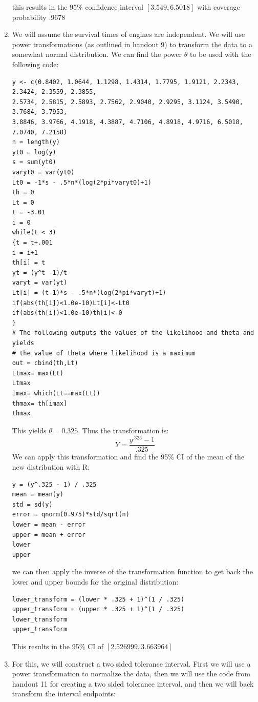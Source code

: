 \documentclass{article}
\begin{document}
\begin{enumerate}
this results in the 95\% confidence interval $[3.549, 6.5018]$ with coverage probability .9678
\item We will assume the survival times of engines are independent. We will use power transformations (as outlined in handout 9) to transform the data to a somewhat normal distribution. We can find the power $\theta$ to be used with the following code: \\
\begin{verbatim}
y <- c(0.8402, 1.0644, 1.1298, 1.4314, 1.7795, 1.9121, 2.2343, 2.3424, 2.3559, 2.3855,
2.5734, 2.5815, 2.5893, 2.7562, 2.9040, 2.9295, 3.1124, 3.5490, 3.7684, 3.7953,
3.8846, 3.9766, 4.1918, 4.3887, 4.7106, 4.8918, 4.9716, 6.5018, 7.0740, 7.2158)
n = length(y)
yt0 = log(y)
s = sum(yt0)
varyt0 = var(yt0)
Lt0 = -1*s - .5*n*(log(2*pi*varyt0)+1)
th = 0
Lt = 0
t = -3.01
i = 0
while(t < 3)
{t = t+.001
i = i+1
th[i] = t
yt = (y^t -1)/t
varyt = var(yt)
Lt[i] = (t-1)*s - .5*n*(log(2*pi*varyt)+1)
if(abs(th[i])<1.0e-10)Lt[i]<-Lt0
if(abs(th[i])<1.0e-10)th[i]<-0
}
# The following outputs the values of the likelihood and theta and yields
# the value of theta where likelihood is a maximum
out = cbind(th,Lt)
Ltmax= max(Lt)
Ltmax
imax= which(Lt==max(Lt))
thmax= th[imax]
thmax
\end{verbatim}
This yields $\theta = 0.325$. Thus the transformation is: \\
\[
Y = \frac{y^{.325} - 1}{.325}
\]
We can apply this transformation and find the 95\% CI of the mean of the new distribution with R: \\
\begin{verbatim}
y = (y^.325 - 1) / .325
mean = mean(y)
std = sd(y)
error = qnorm(0.975)*std/sqrt(n)
lower = mean - error
upper = mean + error
lower
upper
\end{verbatim}
we can then apply the inverse of the transformation function to get back the lower and upper bounds for the original distribution: \\
\begin{verbatim}
lower_transform = (lower * .325 + 1)^(1 / .325)
upper_transform = (upper * .325 + 1)^(1 / .325)
lower_transform
upper_transform
\end{verbatim}
This results in the 95\% CI of $[2.526999, 3.663964]$
\item For this, we will construct a two sided tolerance interval. First we will use a power transformation to normalize the data, then we will use the code from handout 11 for creating a two sided tolerance interval, and then we will back transform the interval endpoints: \\

\end{enumerate}
\end{document}
